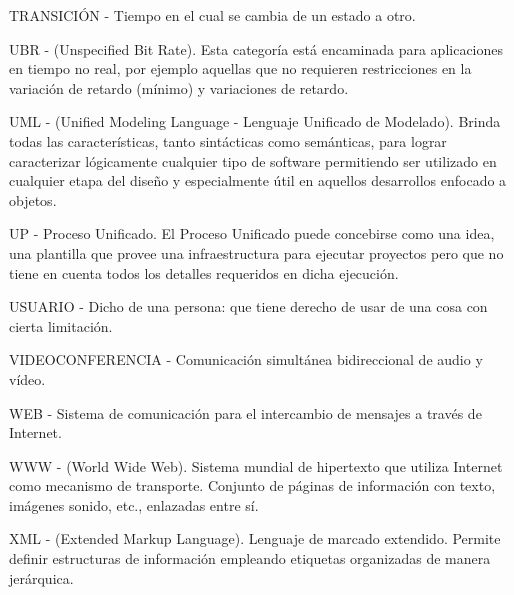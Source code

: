 TRANSICIÓN - Tiempo en el cual se cambia de un estado a otro.

UBR - (Unspecified Bit Rate). Esta categoría está encaminada para aplicaciones en tiempo no real, por ejemplo aquellas que no requieren restricciones en la variación de retardo (mínimo) y variaciones de retardo.

UML - (Unified Modeling Language - Lenguaje Unificado de Modelado). Brinda todas las características, tanto sintácticas como semánticas, para lograr caracterizar lógicamente cualquier tipo de software permitiendo ser utilizado en cualquier etapa del diseño y especialmente útil en aquellos desarrollos enfocado a objetos.

UP - Proceso Unificado. El Proceso Unificado puede concebirse como una idea, una plantilla que provee una infraestructura para ejecutar proyectos pero que no tiene en cuenta todos los detalles requeridos en dicha ejecución.

USUARIO - Dicho de una persona: que tiene derecho de usar de una cosa con cierta limitación.

VIDEOCONFERENCIA -  Comunicación simultánea bidireccional de audio y vídeo.

WEB - Sistema de comunicación para el intercambio de mensajes a través de Internet.

WWW - (World Wide Web). Sistema mundial de hipertexto que utiliza Internet como mecanismo de transporte. Conjunto de páginas de información con texto, imágenes sonido, etc., enlazadas entre sí.

XML -  (Extended Markup Language). Lenguaje de marcado extendido. Permite definir estructuras de información empleando etiquetas organizadas de manera jerárquica.